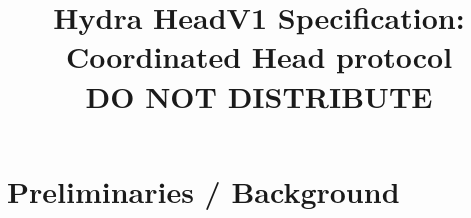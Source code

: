 \documentclass[11pt]{article}
\begin{document}
\date{}

\title{\Large \textbf{Hydra HeadV1 Specification: Coordinated Head protocol}\\[2ex] DO NOT DISTRIBUTE}
\author{}

\maketitle



\section{Preliminaries / Background}








\end{document}
